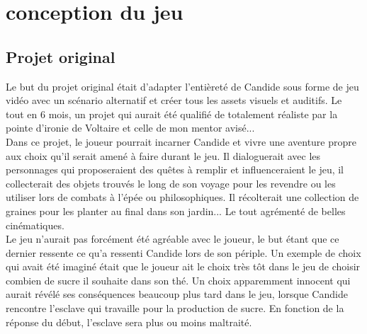 \documentclass[11pt]{article}
\begin{document}
\section{conception du jeu}

\subsection{Projet original}
Le but du projet original était d'adapter l'entièreté de Candide sous forme de jeu vidéo avec un scénario alternatif et créer tous les assets visuels et auditifs. Le tout en 6 mois, un projet qui aurait été qualifié de totalement réaliste par la pointe d'ironie de Voltaire et celle de mon mentor avisé...\\

Dans ce projet, le joueur pourrait incarner Candide et vivre une aventure propre aux choix qu'il serait amené à faire durant le jeu. Il dialoguerait avec les personnages qui proposeraient des quêtes à remplir et influenceraient le jeu, il collecterait des objets trouvés le long de son voyage pour les revendre ou les utiliser lors de combats à l'épée ou philosophiques. Il récolterait une collection de graines pour les planter au final dans son jardin... Le tout agrémenté de belles cinématiques.\\ Le jeu n'aurait pas forcément été agréable avec le joueur, le but étant que ce dernier ressente ce qu'a ressenti Candide lors de son périple. Un exemple de choix qui avait été imaginé était  que le joueur ait le choix très tôt dans le jeu de choisir combien de sucre il souhaite dans son thé. Un choix apparemment innocent qui aurait révélé ses conséquences beaucoup plus tard dans le jeu, lorsque Candide rencontre l'esclave qui travaille pour la production de sucre. En fonction de la réponse du début, l'esclave sera plus ou moins maltraité. 
\end{document}
